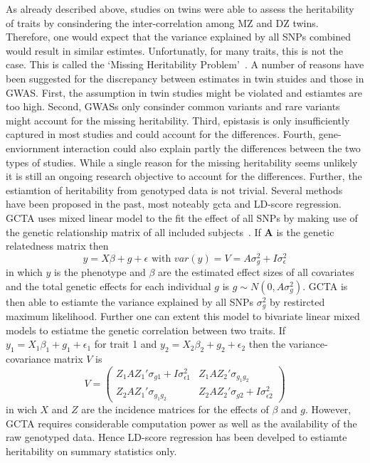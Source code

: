 As already described above, studies on twins were able to assess the heritability of traits by consindering the inter-correlation among MZ and DZ twins.
Therefore, one would expect that the variance explained by all SNPs combined would result in similar estimtes.
Unfortunatly, for many traits, this is not the case.
This is called the `Missing Heritability Problem'~\cite{Vineis2010}.
A number of reasons have been suggested for the discrepancy between estimates in twin stuides and those in GWAS\@.
First, the assumption in twin studies might be violated and estiamtes are too high.
Second, GWASs only consinder common variants and rare variants might account for the missing heritability.
Third, epistasis is only insufficiently captured in most studies and could account for the differences.
Fourth, gene-enviornment interaction could also explain partly the differences between the two types of studies.
While a single reason for the missing heritability seems unlikely it is still an ongoing research objective to account for the differences.
Further, the estiamtion of heritability from genotyped data is not trivial.
Several methods have been proposed in the past, most noteably \acrfull{gcta} and LD-score regression.
GCTA uses mixed linear model to the fit the effect of all SNPs by making use of the genetic relationship matrix of all included subjects~\cite{Yang2011}.
If $\textbf{A}$ is the genetic relatedness matrix then
\begin{equation}
  y = X\beta + g + \epsilon \text{ with } var(y) = V = A\sigma^2_g + I\sigma^2_\epsilon
\end{equation}
in which $y$ is the phenotype and $\beta$ are the estimated effect sizes of all covariates and the total genetic effects for each individual $g$ is $g \sim N(0, A\sigma^2_g)$.
GCTA is then able to estiamte the variance explained by all SNPs $\sigma^2_g$ by restircted maximum likelihood.
Further one can extent this model to bivariate linear mixed models to estiatme the genetic correlation between two traits.
If $y_1 = X_1\beta_1 + g_1 + \epsilon_1$ for trait 1 and $y_2= X_2\beta_2 + g_2 + \epsilon_2$ then the variance-covariance matrix $V$ is
\begin{equation}
  V = 
  \begin{pmatrix}
    Z_1AZ_1'\sigma_{g1} + I\sigma^2_{\epsilon 1} & Z_1AZ_2'\sigma_{g_1g_2} \\
    Z_2AZ_1'\sigma_{g_1g_2} & Z_2AZ_2'\sigma_{g2} + I\sigma^2_{\epsilon 2}
  \end{pmatrix}
\end{equation}
in wich $X$ and $Z$ are the incidence matrices for the effects of $\beta$ and $g$.
However, GCTA requires considerable computation power as well as the availability of the raw genotyped data.
Hence LD-score regression has been develped to estiamte heritability on summary statistics only.

